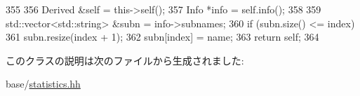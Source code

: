 \begin{DoxyCode}
355     {
356         Derived &self = this->self();
357         Info *info = self.info();
358 
359         std::vector<std::string> &subn = info->subnames;
360         if (subn.size() <= index)
361             subn.resize(index + 1);
362         subn[index] = name;
363         return self;
364     }
\end{DoxyCode}


このクラスの説明は次のファイルから生成されました:\begin{DoxyCompactItemize}
\item 
base/\hyperlink{statistics_8hh}{statistics.hh}\end{DoxyCompactItemize}
